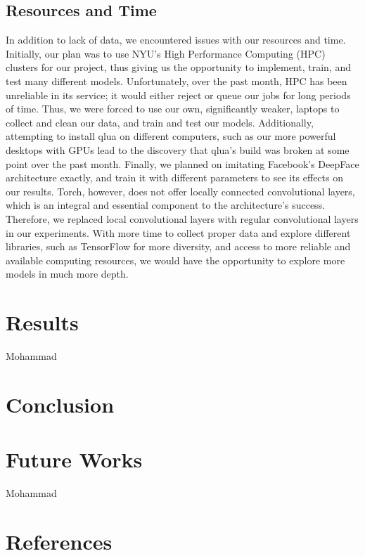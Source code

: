 \documentclass[11pt]{article}
\begin{document}
    \subsection{Resources and Time}
	\par
	In addition to lack of data, we encountered issues with our resources and time. Initially, our plan was to use NYU's High Performance Computing (HPC) clusters for our project, thus giving us the opportunity to implement, train, and test many different models. Unfortunately, over the past month, HPC has been unreliable in its service; it would either reject or queue our jobs for long periods of time. Thus, we were forced to use our own, significantly weaker, laptops to collect and clean our data, and train and test our models. Additionally, attempting to install qlua on different computers, such as our more powerful desktops with GPUs lead to the discovery that qlua's build was  broken at some point over the past month. Finally, we planned on imitating Facebook's DeepFace architecture exactly, and train it with different parameters to see its effects on our results. Torch, however, does not offer locally connected convolutional layers, which is an integral and essential component to the architecture's success. Therefore, we replaced local convolutional layers with regular convolutional layers in our experiments. With more time to collect proper data and explore different libraries, such as TensorFlow for more diversity, and access to more reliable and available computing resources, we would have the opportunity to explore more models in much more depth. 
\section{Results} Mohammad
\section{Conclusion}
    \par
    
\section{Future Works} Mohammad
\section{References}
\end{document}
